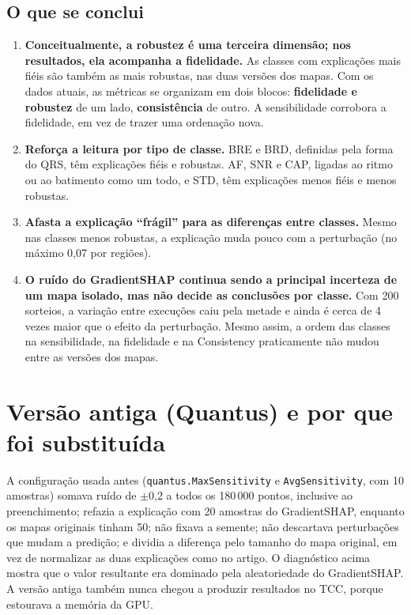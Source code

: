 \documentclass[11pt,a4paper]{article}
\begin{document}
\subsection{O que se conclui}
\begin{enumerate}
\item \textbf{Conceitualmente, a robustez é uma terceira dimensão; nos resultados, ela acompanha a fidelidade.} As classes com explicações mais fiéis são também as mais robustas, nas duas versões dos mapas. Com os dados atuais, as métricas se organizam em dois blocos: \textbf{fidelidade e robustez} de um lado, \textbf{consistência} de outro. A sensibilidade corrobora a fidelidade, em vez de trazer uma ordenação nova.
\item \textbf{Reforça a leitura por tipo de classe.} BRE e BRD, definidas pela forma do QRS, têm explicações fiéis e robustas. AF, SNR e CAP, ligadas ao ritmo ou ao batimento como um todo, e STD, têm explicações menos fiéis e menos robustas.
\item \textbf{Afasta a explicação “frágil” para as diferenças entre classes.} Mesmo nas classes menos robustas, a explicação muda pouco com a perturbação (no máximo 0,07 por regiões).
\item \textbf{O ruído do GradientSHAP continua sendo a principal incerteza de um mapa isolado, mas não decide as conclusões por classe.} Com 200 sorteios, a variação entre execuções caiu pela metade e ainda é cerca de 4 vezes maior que o efeito da perturbação. Mesmo assim, a ordem das classes na sensibilidade, na fidelidade e na Consistency praticamente não mudou entre as versões dos mapas.
\end{enumerate}

\section{Versão antiga (Quantus) e por que foi substituída}
A configuração usada antes (\texttt{quantus.MaxSensitivity} e \texttt{AvgSensitivity}, com 10 amostras) somava ruído de $\pm$0,2 a todos os 180\,000 pontos, inclusive ao preenchimento; refazia a explicação com 20 amostras do GradientSHAP, enquanto os mapas originais tinham 50; não fixava a semente; não descartava perturbações que mudam a predição; e dividia a diferença pelo tamanho do mapa original, em vez de normalizar as duas explicações como no artigo. O diagnóstico acima mostra que o valor resultante era dominado pela aleatoriedade do GradientSHAP. A versão antiga também nunca chegou a produzir resultados no TCC, porque estourava a memória da GPU.
\end{document}
